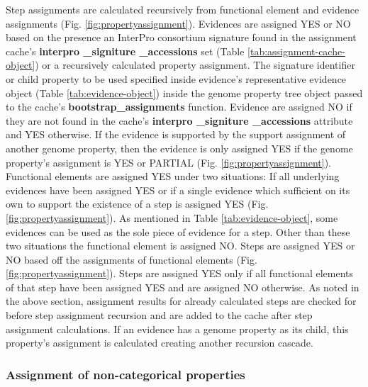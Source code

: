 Step assignments are calculated recursively from functional element and evidence assignments (Fig. \ref{fig:propertyassignment}). Evidences are assigned YES or NO based on the presence an InterPro consortium signature found in the assignment cache's \textbf{interpro \_signiture \_accessions} set (Table \ref{tab:assignment-cache-object}) or a recursively calculated property assignment. The signature identifier or child property to be used specified inside evidence's representative evidence object (Table \ref{tab:evidence-object}) inside the genome property tree object passed to the cache's \textbf{bootstrap\_assignments} function. Evidence are assigned NO if they are not found in the cache's \textbf{interpro \_signiture \_accessions} attribute and YES otherwise. If the evidence is supported by the support assignment of another genome property, then the evidence is only assigned YES if the genome property's assignment is YES or PARTIAL (Fig. \ref{fig:propertyassignment}).  Functional elements are assigned YES under two situations: If all underlying evidences have been assigned YES or if a single evidence which sufficient on its own to support the existence of a step is assigned YES (Fig. \ref{fig:propertyassignment}). As mentioned in Table \ref{tab:evidence-object}, some evidences can be used as the sole piece of evidence for a step. Other than these two situations the functional element is assigned NO. Steps are assigned YES or NO based off the assignments of functional elements (Fig. \ref{fig:propertyassignment}). Steps are assigned YES only if all functional elements of that step have been assigned YES and are assigned NO otherwise. As noted in the above section, assignment results for already calculated steps are checked for before step assignment recursion and are added to the cache after step assignment calculations. If an evidence has a genome property as its child, this property's assignment is calculated creating another recursion cascade.

\subsubsection{Assignment of non-categorical properties}

